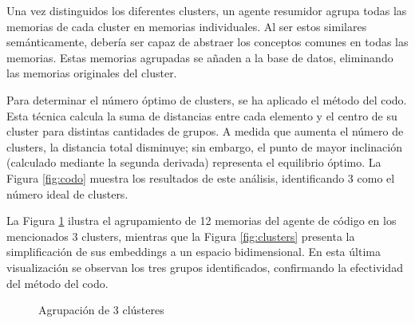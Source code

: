 Una vez distinguidos los diferentes clusters, un agente resumidor agrupa todas las memorias de cada cluster en memorias individuales. Al ser estos similares semánticamente, debería ser capaz de abstraer los conceptos comunes en todas las memorias. Estas memorias agrupadas se añaden a la base de datos, eliminando las memorias originales del cluster.

Para determinar el número óptimo de clusters, se ha aplicado el método del codo. Esta técnica calcula la suma de distancias entre cada elemento y el centro de su cluster para distintas cantidades de grupos. A medida que aumenta el número de clusters, la distancia total disminuye; sin embargo, el punto de mayor inclinación (calculado mediante la segunda derivada) representa el equilibrio óptimo. La Figura \ref{fig:codo} muestra los resultados de este análisis, identificando 3 como el número ideal de clusters.

La Figura \ref{fig:clustering-analysis} ilustra el agrupamiento de 12 memorias del agente de código en los mencionados 3 clusters, mientras que la Figura \ref{fig:clusters} presenta la simplificación de sus embeddings a un espacio bidimensional. En esta última visualización se observan los tres grupos identificados, confirmando la efectividad del método del codo.

\begin{figure}[h]
\centering
{}
\caption{Agrupación de 3 clústeres}
\label{fig:clustering-analysis}
\end{figure}

